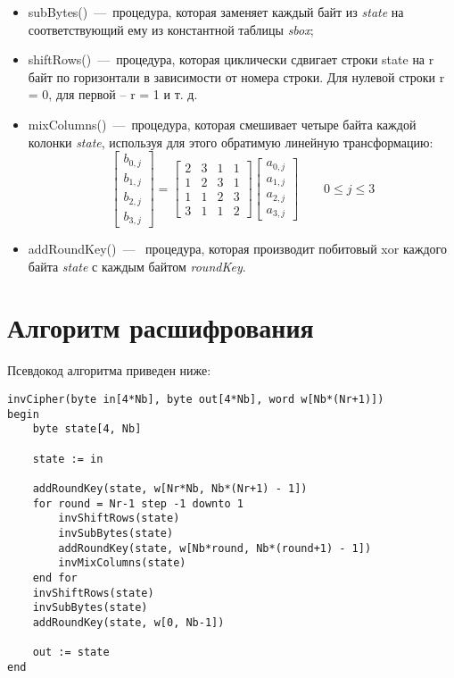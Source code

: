 \documentclass[utf8x, 14pt, bold, times]{G7-32} %
\begin{document}
\begin{itemize}
\item subBytes()~---~процедура, которая заменяет каждый байт из \textsl{state} на
      соответствующий ему из константной таблицы \textsl{sbox};
\item shiftRows()~---~процедура, которая циклически сдвигает строки state на r байт
      по горизонтали в зависимости от номера строки. Для нулевой строки r = 0, для
      первой -- r = 1 и т. д.
\item mixColumns()~---~процедура, которая смешивает четыре байта каждой колонки
      \textsl{state}, используя для этого обратимую линейную трансформацию:
      $$
      \begin{bmatrix}
        b_{0,j} \\
        b_{1,j} \\
        b_{2,j} \\
        b_{3,j}
      \end{bmatrix}
        =
      \begin{bmatrix}
        2 & 3 & 1 & 1 \\
        1 & 2 & 3 & 1 \\
        1 & 1 & 2 & 3 \\
        3 & 1 & 1 & 2
      \end{bmatrix}
      \begin{bmatrix}
        a_{0,j} \\
        a_{1,j} \\
        a_{2,j} \\
        a_{3,j}
     \end{bmatrix}
     \qquad 0\leq j\leq 3
     $$
\item addRoundKey()~---~ процедура, которая производит побитовый xor каждого
      байта \textsl{state} с каждым байтом \textsl{roundKey}. 
\end{itemize}

\section{Алгоритм расшифрования}

Псевдокод алгоритма приведен ниже:\\

\begin{lstlisting}[style=pseudocode]
invCipher(byte in[4*Nb], byte out[4*Nb], word w[Nb*(Nr+1)])
begin
    byte state[4, Nb]
    
    state := in

    addRoundKey(state, w[Nr*Nb, Nb*(Nr+1) - 1])
    for round = Nr-1 step -1 downto 1
        invShiftRows(state)
        invSubBytes(state)
        addRoundKey(state, w[Nb*round, Nb*(round+1) - 1])
        invMixColumns(state)
    end for
    invShiftRows(state)
    invSubBytes(state)
    addRoundKey(state, w[0, Nb-1])

    out := state
end
\end{lstlisting}
\end{document}

